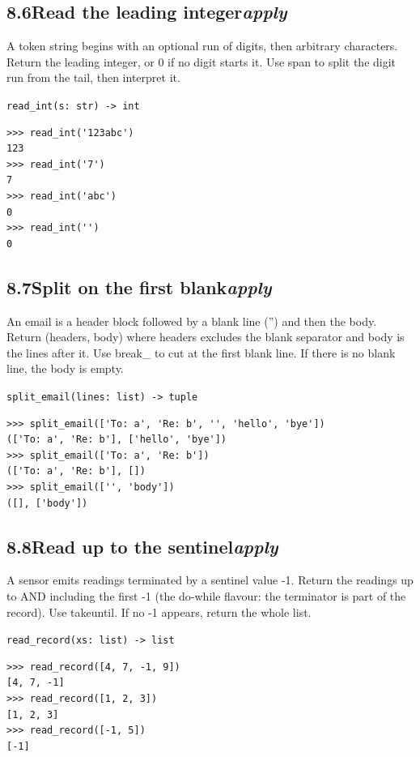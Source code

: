 \documentclass[10pt,letterpaper]{book}
\begin{document}
\subsection*{8.6\quad Read the leading integer\hfill\textnormal{\textit{apply}}}
A token string begins with an optional run of digits, then arbitrary characters. Return the leading integer, or 0 if no digit starts it. Use span to split the digit run from the tail, then interpret it.

\noindent\texttt{read\_int(s: str) -> int}
\begin{lstlisting}[style=ex]
>>> read_int('123abc')
123
>>> read_int('7')
7
>>> read_int('abc')
0
>>> read_int('')
0
\end{lstlisting}
\subsection*{8.7\quad Split on the first blank\hfill\textnormal{\textit{apply}}}
An email is a header block followed by a blank line ('') and then the body. Return (headers, body) where headers excludes the blank separator and body is the lines after it. Use break\_ to cut at the first blank line. If there is no blank line, the body is empty.

\noindent\texttt{split\_email(lines: list) -> tuple}
\begin{lstlisting}[style=ex]
>>> split_email(['To: a', 'Re: b', '', 'hello', 'bye'])
(['To: a', 'Re: b'], ['hello', 'bye'])
>>> split_email(['To: a', 'Re: b'])
(['To: a', 'Re: b'], [])
>>> split_email(['', 'body'])
([], ['body'])
\end{lstlisting}

\subsection*{8.8\quad Read up to the sentinel\hfill\textnormal{\textit{apply}}}
A sensor emits readings terminated by a sentinel value -1. Return the readings up to AND including the first -1 (the do-while flavour: the terminator is part of the record). Use takeuntil. If no -1 appears, return the whole list.

\noindent\texttt{read\_record(xs: list) -> list}
\begin{lstlisting}[style=ex]
>>> read_record([4, 7, -1, 9])
[4, 7, -1]
>>> read_record([1, 2, 3])
[1, 2, 3]
>>> read_record([-1, 5])
[-1]
\end{lstlisting}
\end{document}
